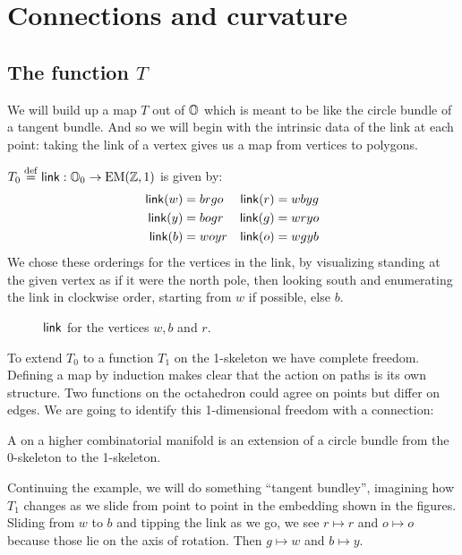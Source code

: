 \section{Connections and curvature}

\subsection{The function \texorpdfstring{\( T \)}{T}}

We will build up a map \( T \) out of \( \mathbb{O} \) which is meant to be like the circle bundle of a tangent bundle. And so we will begin with the intrinsic data of the link at each point: taking the link of a vertex gives us a map from vertices to polygons.

\begin{mydef}
\( T_0\stackrel{\mathrm{def}}{=}\operatorname{\mathsf{link}}:\mathbb{O}_0\to\mathrm{EM}(\mathbb{Z},1) \) is given by:
\begin{align*}
\operatorname{\mathsf{link}}(w) &= brgo & \operatorname{\mathsf{link}}(r) &= wbyg \\
\operatorname{\mathsf{link}}(y) &= bogr & \operatorname{\mathsf{link}}(g) &= wryo \\
\operatorname{\mathsf{link}}(b) &= woyr & \operatorname{\mathsf{link}}(o) &= wgyb
\end{align*}
We chose these orderings for the vertices in the link, by visualizing standing at the given vertex as if it were the north pole, then looking south and enumerating the link in clockwise order, starting from \( w \) if possible, else \( b \).
\end{mydef}

\begin{figure}[htbp]
\centering

\caption{\( \operatorname{\mathsf{link}} \) for the vertices \( w, b\) and \( r \).}
\label{fig:triangle_of_equators}
\end{figure}

To extend \( T_0 \) to a function \( T_1 \) on the 1-skeleton we have complete freedom. Defining a map by induction makes clear that the action on paths is its own structure. Two functions on the octahedron could agree on points but differ on edges. We are going to identify this 1-dimensional freedom with a connection:

\begin{mydef}
\label{def:connection}
A  on a higher combinatorial manifold is an extension of a circle bundle from the 0-skeleton to the 1-skeleton.
\end{mydef}

Continuing the example, we will do something ``tangent bundley'', imagining how \( T_1 \) changes as we slide from point to point in the embedding shown in the figures. Sliding from \( w \) to \( b \) and tipping the link as we go, we see \( r\mapsto r \) and \( o\mapsto o \) because those lie on the axis of rotation. Then \( g\mapsto w \) and \( b\mapsto y \). 

